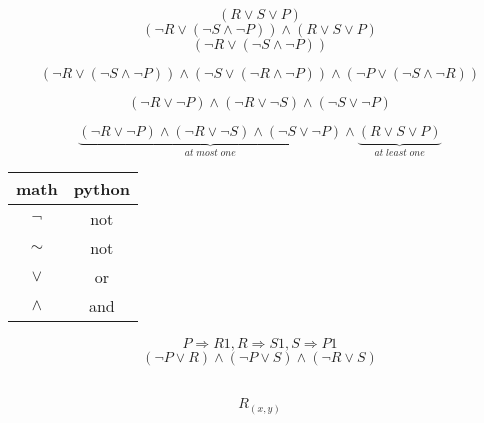 \documentclass[24pt,a4paper]{article}
\begin{document}
\begin{equation}
(R \lor S \lor P)
\end{equation}
\begin{equation}
(\lnot R \lor (\lnot S \land \lnot P)) \land (R \lor S \lor P)
\end{equation}
\begin{equation}
(\lnot R \lor (\lnot S \land \lnot P))
\end{equation}

\begin{equation}
(\lnot R \lor (\lnot S \land \lnot P)) \land (\lnot S \lor (\lnot R \land \lnot P)) \land (\lnot P \lor (\lnot S \land \lnot R))
\end{equation}

\begin{equation}
(\lnot R \lor \lnot P) \land (\lnot R \lor \lnot S) \land (\lnot S \lor \lnot P)
\end{equation}

\begin{equation}
	\underbrace{
		(\lnot R \lor \lnot P) \land (\lnot R \lor \lnot S) \land (\lnot S \lor \lnot P)
	}_{at \; most \; one} \land \underbrace{
		(R \lor S \lor P)
	}_{at \; least \; one}
\end{equation}


\begin{center}
\begin{tabular}{c c}
math & python \\ \hline
$\lnot$ & not \\
$\sim$ & not \\
$\lor$ & or \\
$\land$ & and 

\end{tabular}
\end{center}
\begin{equation}
P \Rightarrow R1, R \Rightarrow S1, S \Rightarrow P1
\end{equation}
\begin{equation}
(\lnot P \lor R) \land (\lnot P \lor S) \land (\lnot R \lor S)
\end{equation}
\begin{center}
\begin{tabular}{c | c | c | c | c | c | | c}

\end{tabular}
\end{center}
\begin{equation}
R_{(x, y)}
\end{equation}
\end{document}
